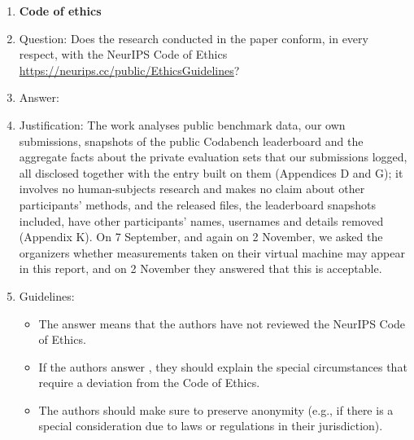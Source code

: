 \begin{enumerate}
\item {\bf Code of ethics}
    \item[] Question: Does the research conducted in the paper conform, in every respect, with the NeurIPS Code of Ethics \url{https://neurips.cc/public/EthicsGuidelines}?
    \item[] Answer: \answerYes{}
    \item[] Justification: The work analyses public benchmark data, our own submissions, snapshots of the public Codabench leaderboard and the aggregate facts about the private evaluation sets that our submissions logged, all disclosed together with the entry built on them (Appendices D and G); it involves no human-subjects research and makes no claim about other participants' methods, and the released files, the leaderboard snapshots included, have other participants' names, usernames and details removed (Appendix K). On 7 September, and again on 2 November, we asked the organizers whether measurements taken on their virtual machine may appear in this report, and on 2 November they answered that this is acceptable.
    \item[] Guidelines:
    \begin{itemize}
        \item The answer \answerNA{} means that the authors have not reviewed the NeurIPS Code of Ethics.
        \item If the authors answer \answerNo, they should explain the special circumstances that require a deviation from the Code of Ethics.
        \item The authors should make sure to preserve anonymity (e.g., if there is a special consideration due to laws or regulations in their jurisdiction).
    \end{itemize}



\end{enumerate}
